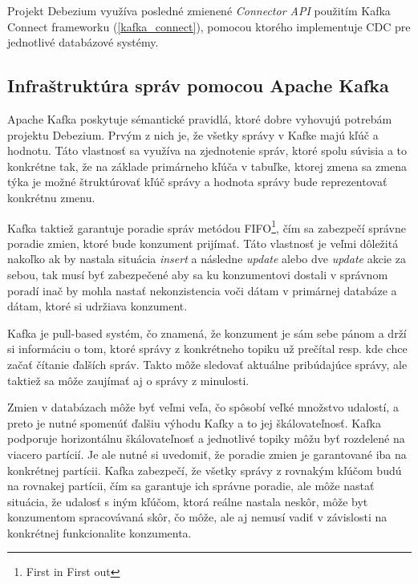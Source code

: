 Projekt Debezium využíva posledné zmienené \textit{Connector API} použitím Kafka Connect frameworku (\ref{kafka_connect}), pomocou ktorého implementuje CDC pre jednotlivé databázové systémy.

\subsection{Infraštruktúra správ pomocou Apache Kafka}
Apache Kafka poskytuje sémantické pravidlá, ktoré dobre vyhovujú potrebám projektu Debezium. Prvým z nich je, že všetky správy v Kafke majú kľúč a hodnotu. Táto vlastnosť sa využíva na zjednotenie správ, ktoré spolu súvisia a to konkrétne tak, že na základe primárneho kľúča v tabuľke, ktorej zmena sa zmena týka je možné štruktúrovať kľúč správy a hodnota správy bude reprezentovať konkrétnu zmenu.

Kafka taktiež garantuje poradie správ metódou FIFO\footnote{First in First out}, čím sa zabezpečí správne poradie zmien, ktoré bude konzument prijímať. Táto vlastnosť je veľmi dôležitá nakoľko ak by nastala situácia \textit{insert} a následne \textit{update} alebo dve \textit{update} akcie za sebou, tak musí byť zabezpečené aby sa ku konzumentovi dostali v správnom poradí inač by mohla nastať nekonzistencia voči dátam v primárnej databáze a dátam, ktoré si udržiava konzument.

Kafka je pull-based systém, čo znamená, že konzument je sám sebe pánom a drží si informáciu o tom, ktoré správy z konkrétneho topiku už prečítal resp. kde chce začať čítanie ďalších správ. Takto môže sledovať aktuálne pribúdajúce správy, ale taktiež sa môže zaujímať aj o správy z minulosti.

Zmien v databázach môže byť veľmi veľa, čo spôsobí veľké množstvo udalostí, a preto je nutné spomenúť ďalšiu výhodu Kafky a to jej škálovateľnosť. Kafka podporuje horizontálnu škálovateľnosť a jednotlivé topiky môžu byť rozdelené na viacero partícií. Je ale nutné si uvedomiť, že poradie zmien je garantované iba na konkrétnej partícii. Kafka zabezpečí, že všetky správy z rovnakým kľúčom budú na rovnakej partícii, čím sa garantuje ich správne poradie, ale môže nastať situácia, že udalosť s iným kľúčom, ktorá reálne nastala neskôr, môže byt konzumentom spracovávaná skôr, čo môže, ale aj nemusí vadiť v závislosti na konkrétnej funkcionalite konzumenta.


